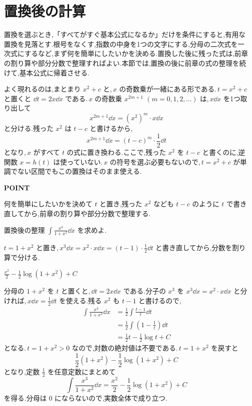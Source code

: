 \section{置換後の計算}\label{節:置換後の整理}

置換を選ぶとき,「すべてがすぐ基本公式になるか」だけを条件にすると,有用な置換を見落とす.根号をなくす,指数の中身を1つの文字にする,分母の二次式を一次式にするなど,まず何を簡単にしたいかを決める.置換した後に残った式は,前章の割り算や部分分数で整理すればよい.本節では,置換の後に前章の式の整理を続けて,基本公式に帰着させる.

よく現れるのは,まとまり $x^2+c$ と,\,$x$ の奇数乗が一緒にある形である.\,$t=x^2+c$ と置くと $\dd t=2x\dd x$ である.\,$x$ の奇数乗 $x^{2m+1}$ $(m=0,1,2,\dots)$ は,\,$x\dd x$ を1つ取り出して
\[
 x^{2m+1}\dd x=(x^2)^m\cdot x\dd x
\]
と分ける.残った $x^2$ は $t-c$ と書けるから,
\[
 x^{2m+1}\dd x=(t-c)^m\cdot\frac12\dd t
\]
となり,\,$x$ がすべて $t$ の式に置き換わる.ここで,残った $x^2$ を $t-c$ と書くのに,逆関数 $x=h(t)$ は使っていない.\,$x$ の符号を選ぶ必要もないので,\,$t=x^2+c$ が単調でない区間でもこの置換はそのまま使える.

\begin{bookpoint}
\textbf{POINT}\par
何を簡単にしたいかを決めて $t$ と置き,残った $x^2$ なども $t-c$ のように $t$ で書き直してから,前章の割り算や部分分数で整理する.
\end{bookpoint}

\begin{example}{置換後の整理}
$\int\frac{x^3}{1+x^2}\dd x$ を求めよ.
\end{example}

$t=1+x^2$ と置き,\,$x^3\dd x=x^2\cdot x\dd x=(t-1)\cdot\frac12\dd t$ と書き直してから,分数を割り算で分ける.

$\frac{x^2}{2}-\frac12\log(1+x^2)+C$

分母の $1+x^2$ を $t$ と置くと,\,$\dd t=2x\dd x$ である.分子の $x^3$ を $x^3\dd x=x^2\cdot x\dd x$ と分ければ,\,$x\dd x=\frac12\dd t$ を使える.残る $x^2$ も $t-1$ と書けるので,
\begin{align*}
 \int\frac{x^3}{1+x^2}\dd x
 &=\frac12\int\frac{t-1}{t}\dd t\\
 &=\frac12\int\left(1-\frac1t\right)\dd t\\
 &=\frac12t-\frac12\log t+C
\end{align*}
となる.\,$t=1+x^2>0$ なので,対数の絶対値は不要である.\,$t=1+x^2$ を戻すと
\[
 \frac12(1+x^2)-\frac12\log(1+x^2)+C
\]
となり,定数 $\frac12$ を任意定数にまとめて
\[
 \int\frac{x^3}{1+x^2}\dd x
 =\frac{x^2}{2}-\frac12\log(1+x^2)+C
\]
を得る.分母は $0$ にならないので,実数全体で成り立つ.

